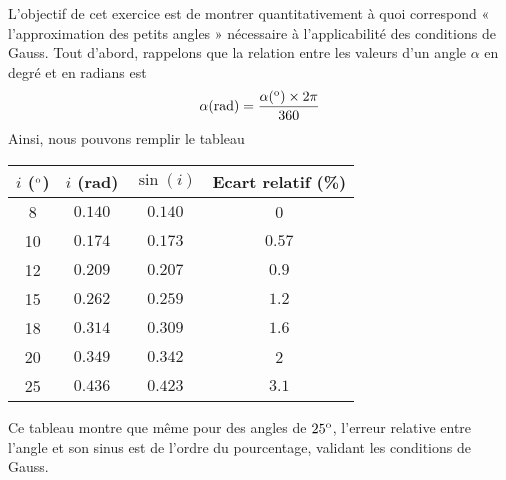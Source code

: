 \documentclass[../main/main.tex]{subfiles}
\begin{document}
L'objectif de cet exercice est de montrer quantitativement à quoi correspond
« l'approximation des petits angles » nécessaire à l'applicabilité des conditions
de Gauss. Tout d'abord, rappelons que la relation entre les valeurs d'un angle
$\alpha$ en degré et en radians est
\begin{equation}
	\alpha({\rm rad}) = \dfrac{\alpha(^{\rm o})\times 2\pi}{360}
\end{equation}
Ainsi, nous pouvons remplir le tableau
\begin{table*}[h!]
	\centering
	\begin{tabular}{|c|c|c|c|}
		\hline
		$i$ ($^{\rm o}$) & $i$ (rad) & $\sin(i)$ & Ecart relatif (\%) \\
		\hline
		8 & $0.140$ & $0.140$ & 0 \\
		\hline
		10 & $0.174$ & $0.173$ & $0.57$ \\
		\hline
		12 & $0.209$ & $0.207$ & $0.9$ \\
		\hline
		15 & $0.262$ & $0.259$ & $1.2$ \\
		\hline
		18 & $0.314$ & $0.309$ & $1.6$ \\
		\hline
		20 & $0.349$ & $0.342$ & 2 \\
		\hline
		25 & $0.436$ & $0.423$ & $3.1$ \\
		\hline
	\end{tabular}
\end{table*}
Ce tableau montre que même pour des angles de $25^{\rm o}$, l'erreur relative
entre l'angle et son sinus est de l'ordre du pourcentage, validant les
conditions de Gauss.

\theendnotes
\end{document}
